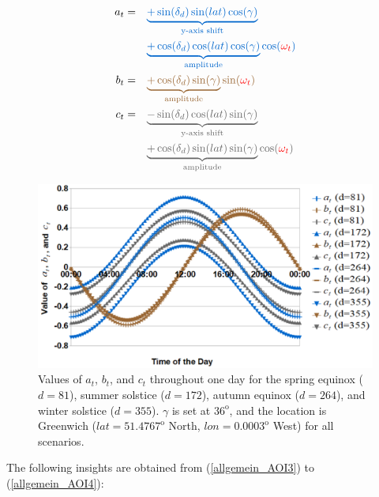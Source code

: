 \begin{align}
a_t =& \quad \textcolor{SeaBlue}{\underbrace{+\sin(\delta_d) \sin(lat) \cos(\gamma)}_{\text{y-axis shift}}} \nonumber\\
     & \quad\textcolor{SeaBlue}{\underbrace{+\cos(\delta_d) \cos(lat) \cos(\gamma)}_{\text{amplitude}} \cos(\textcolor{red}{\omega_t})} \label{allgemein_AOI3}\\
		b_t =& \quad \textcolor{Orange8}{\underbrace{+\cos(\delta_d) \sin(\gamma)}_{\text{amplitude}}\sin(\textcolor{red}{\omega_t})} \\      
c_t =& \quad \textcolor{Gray7}{\underbrace{-\sin(\delta_d) \cos(lat) \sin(\gamma)}_{\text{y-axis shift}}}\nonumber\\
     & \quad\textcolor{Gray7}{\underbrace{+\cos(\delta_d) \sin(lat) \sin(\gamma)}_{\text{amplitude}} \cos(\textcolor{red}{\omega_t})}\label{allgemein_AOI4} 
\end{align}


\begin{figure}[H]
	\centering
		\includegraphics[width=1\columnwidth]{pictures/abc}
\caption[Values of $a_t$, $b_t$, and $c_t$ throughout one day for the spring equinox, summer solstice, autumn equinox, and winter solstice]{Values of $a_t$, $b_t$, and $c_t$ throughout one day for the spring equinox ($d=81$), summer solstice ($d=172$), autumn equinox ($d=264$), and winter solstice ($d=355$). $\gamma$ is set at $36^{\mathrm{o}}$, and the location is Greenwich ($lat=51.4767^{\mathrm{o}}$ North, $lon=0.0003^{\mathrm{o}}$ West) for all scenarios.  \label{abc_values}}
\end{figure}



The following insights are obtained from (\ref{allgemein_AOI3}) to (\ref{allgemein_AOI4}):

